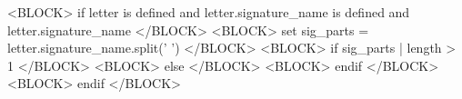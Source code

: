 
<BLOCK> if letter is defined and letter.signature_name is defined and letter.signature_name </BLOCK>
<BLOCK> set sig_parts = letter.signature_name.split(' ') </BLOCK>
\makeatletter
<BLOCK> if sig_parts | length > 1 </BLOCK>
\renewcommand{\@firstname}{<VAR> sig_parts[0] | latex_escape </VAR>}
\renewcommand{\@lastname}{<VAR> sig_parts[1:] | join(' ') | latex_escape </VAR>}
<BLOCK> else </BLOCK>
\renewcommand{\@firstname}{<VAR> letter.signature_name | latex_escape </VAR>}
\renewcommand{\@lastname}{}
<BLOCK> endif </BLOCK>
\makeatother
<BLOCK> endif </BLOCK>
